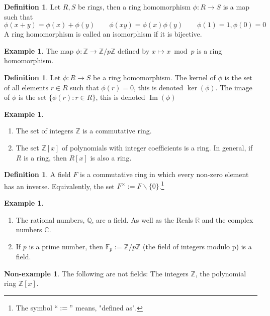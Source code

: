 \documentclass[11pt,a4paper]{report}
\theoremstyle{plain}
\theoremstyle{definition}
\newtheorem{defn}[subsection]{Definition}
\newtheorem{exmp}[subsection]{Example}
\newtheorem{nexmp}[subsection]{Non-example}
\theoremstyle{definition}
\newcommand{\ZZ}{\mathbb{Z}}
\newcommand{\RR}{\mathbb{R}}
\def\CC{\mathbb{C}}
\def\FF{\mathbb{F}}
\def\QQ{\mathbb{Q}}
\DeclareMathOperator{\im}{Im}
\begin{document}
	\begin{defn}
		Let $R,S$ be rings, then a ring homomorphism  $\phi:R \to S$ is a map such that \[\phi(x+y)=\phi(x)+\phi(y) \qquad \phi(xy)=\phi(x)\phi(y) \qquad \phi(1)=1, \phi(0)=0\]
		A ring homomorphism is called an isomorphism if it is bijective.
	\end{defn}
	\begin{exmp}
		The map $\phi: \ZZ \to \ZZ/p\ZZ$ defined by  $x \mapsto x \bmod p$ is a ring homomorphism.
	\end{exmp}
	\begin{defn}
		Let $\phi: R \to S$ be a ring homomorphism. The kernel of $\phi$ is the set of all elements $r \in R$ such that $\phi(r)=0$, this is denoted $\ker(\phi)$. The image of $\phi$ is the set $\{\phi(r): r \in R\}$, this is denoted $\im(\phi)$
	\end{defn}
	
	
	
	\begin{exmp}
		\begin{enumerate}
			\item The set of integers $\ZZ$ is a commutative ring.
			\item The set $\ZZ[x]$ of polynomials with integer coefficients is a ring. In general, if $R$ is a ring, then $R[x]$ is also a ring. 
		\end{enumerate}
	\end{exmp}
	
	\begin{defn}
		A field $F$ is a commutative ring in which every  non-zero element has an inverse. Equivalently, the set $F^{\times}:=F \backslash\{0\}$.\footnote{The symbol $``:="$ means, "defined as".}
	\end{defn}
	\begin{exmp}
		\begin{enumerate}
			\item The rational numbers, $\QQ$, are a field. As well as the Reals $\RR$ and the complex numbers $\CC$.
			\item If $p$ is a prime number, then $\FF_p:=\ZZ/p\ZZ$ (the field of integers modulo p) is a field.
			
		\end{enumerate}
	\end{exmp}	
	
	\begin{nexmp}
		The following are not fields: The integers $\ZZ$, the polynomial ring $\ZZ[x]$.
	\end{nexmp}
	
\end{document}
